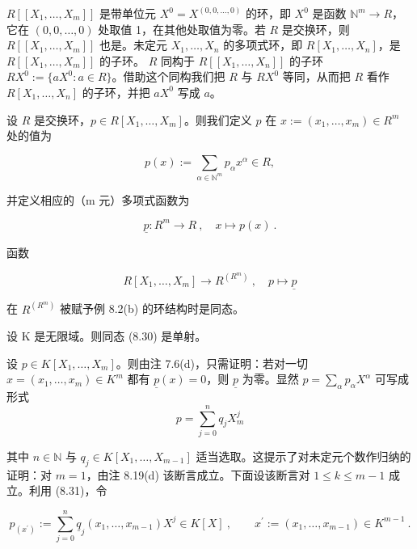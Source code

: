 \begin{remark}

\begin{items}
\item

$ R[[X_1, \ldots, X_m]] $ 是带单位元  $ X^0 = X^{(0,0,\ldots,0)} $ 的环，即  $ X^0 $ 是函数  $ \mathbb{N}^m \to R $，它在  $ (0, 0, \ldots, 0) $ 处取值 1，在其他处取值为零。若  $ R $ 是交换环，则  $ R[[X_1, \ldots, X_m]] $ 也是。未定元  $ X_1, \ldots, X_n $ 的多项式环，即  $ R[X_1, \ldots, X_n] $，是  $ R[[X_1, \ldots, X_m]] $ 的子环。 $ R $ 同构于  $ R[[X_1, \ldots, X_n]] $ 的子环  $ RX^0 := \{a X^0 : a \in R\} $。借助这个同构我们把  $ R $ 与  $ RX^0 $ 等同，从而把  $ R $ 看作  $ R[X_1, \ldots, X_n] $ 的子环，并把  $ a X^0 $ 写成  $ a $。

\item

设 $R$ 是交换环，$p \in R[X_1, \ldots, X_m]$。则我们定义 $p$ 在 $x := (x_1, \ldots, x_m) \in R^m$ 处的值为

\[
p(x):=\sum_{\alpha\in\mathbb{N}^{m}}p_{\alpha}x^{\alpha}\in R,
\]

并定义相应的（m 元）多项式函数为

\[
\underline{p}:R^{m}\to R~,\quad x\mapsto p(x)~.
\]

函数

\begin{equation}
R[X_{1},\ldots,X_{m}]\to R^{(R^{m})}~,\quad p\mapsto\underline{p}
\end{equation}

在  $ R^{(R^{m})} $ 被赋予例 8.2(b) 的环结构时是同态。

\item

设 K 是无限域。则同态 (8.30) 是单射。

\proofhead
设 $p \in K[X_1, \ldots, X_m]$。则由注 7.6(d)，只需证明：若对一切 $x = (x_1, \ldots, x_m) \in K^m$ 都有 $\underline{p}(x) = 0$，则 $\underline{p}$ 为零。显然 $p = \sum_\alpha p_\alpha X^\alpha$ 可写成形式
\begin{equation}
p=\sum_{j=0}^{n}q_{j} X_{m}^{j}
\end{equation}

其中  $ n \in \mathbb{N} $ 与  $ q_j \in K[X_1, \ldots, X_{m-1}] $ 适当选取。这提示了对未定元个数作归纳的证明：对  $ m = 1 $，由注 8.19(d) 该断言成立。下面设该断言对  $ 1 \leq k \leq m-1 $ 成立。利用 (8.31)，令

\[
p_{(x^{\prime})}:=\sum_{j=0}^{n}\underline{{q}}_{j}(x_{1},\ldots,x_{m-1})X^{j}\in K[X]~,\qquad x^{\prime}:=(x_{1},\ldots,x_{m-1})\in K^{m-1}~.
\]


\end{items}
\end{remark}
